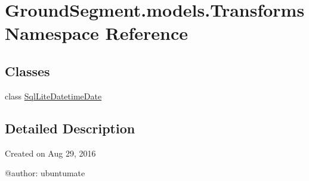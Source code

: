 \hypertarget{namespace_ground_segment_1_1models_1_1_transforms}{}\section{Ground\+Segment.\+models.\+Transforms Namespace Reference}
\label{namespace_ground_segment_1_1models_1_1_transforms}
\subsection*{Classes}
\begin{DoxyCompactItemize}
\item 
class \hyperlink{class_ground_segment_1_1models_1_1_transforms_1_1_sql_lite_datetime_date}{Sql\+Lite\+Datetime\+Date}
\end{DoxyCompactItemize}


\subsection{Detailed Description}
\begin{DoxyVerb}Created on Aug 29, 2016

@author: ubuntumate
\end{DoxyVerb}
 